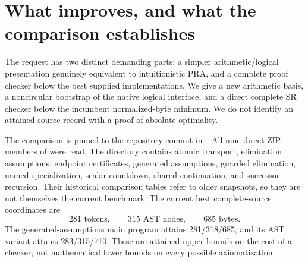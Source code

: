\section{What improves, and what the comparison establishes}
\label{sec:scope}

The request has two distinct demanding parts: a simpler arithmetic/logical
presentation genuinely equivalent to intuitionistic PRA, and a complete
proof checker below the best supplied implementations. We give a new arithmetic basis, a noncircular bootstrap of the native
logical interface, and a direct complete SR checker below the incumbent
normalized-byte minimum. We do not identify an attained source record
with a proof of absolute optimality.

The comparison is pinned to the repository commit in~\cite{snapshot}.
All nine direct ZIP members of \mbox{} were read. The directory
contains atomic transport, elimination assumptions, endpoint certificates,
generated assumptions, guarded elimination, named specialization, scalar
countdown, shared continuation, and successor recursion. Their historical
comparison tables refer to older snapshots, so they are not themselves the
current benchmark. The current best complete-source coordinates are
\[
                 281\text{ tokens},\qquad315\text{ AST nodes},\qquad685\text{ bytes}.
\]
The generated-assumptions main program attains 281/318/685, and its AST
variant attains 283/315/710. These are attained upper bounds on the cost of
a checker, not mathematical lower bounds on every possible axiomatization.

